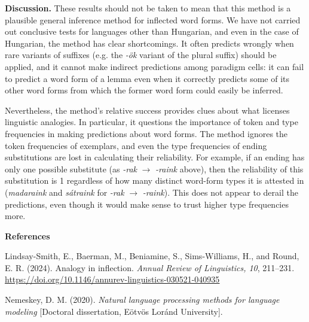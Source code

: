 \documentclass[12pt, a4paper]{article}
\begin{document}
\textbf{Discussion.} These results should not be taken to mean that this method is a plausible general inference method for inflected word forms. We have not carried out conclusive tests for languages other than Hungarian, and even in the case of Hungarian, the method has clear shortcomings. It often predicts wrongly when rare variants of suffixes (e.g. the \textit{-ök} variant of the plural suffix) should be applied, and it cannot make indirect predictions among paradigm cells: it can fail to predict a word form of a lemma even when it correctly predicts some of its other word forms from which the former word form could easily be inferred.

Nevertheless, the method's relative success provides clues about what licenses linguistic analogies. In particular, it questions the importance of token and type frequencies in making predictions about word forms. The method ignores the token frequencies of exemplars, and even the type frequencies of ending substitutions are lost in calculating their reliability. For example, if an ending has only one possible substitute (as \textit{-rak} $ \to $ \textit{-raink} above), then the reliability of this substitution is 1 regardless of how many distinct word-form types it is attested in (\textit{madaraink} and \textit{sátraink} for \textit{-rak} $ \to $ \textit{-raink}). This does not appear to derail the predictions, even though it would make sense to trust higher type frequencies more.

{\footnotesize
\textbf{References}
\vspace{-0.3em}

Lindsay-Smith, E., Baerman, M., Beniamine, S., Sims-Williams, H., and Round, E. R. (2024). Analogy in inflection. \textit{Annual Review of Linguistics, 10}, 211--231. \href{https://doi.org/10.1146/annurev-linguistics-030521-040935}{\uline{https://doi.org/10.1146/annurev-linguistics-030521-040935}}
\vspace{-0.4em}

Nemeskey, D. M. (2020). \textit{Natural language processing methods for language modeling} [Doctoral dissertation, Eötvös Loránd University].

}
\end{document}
